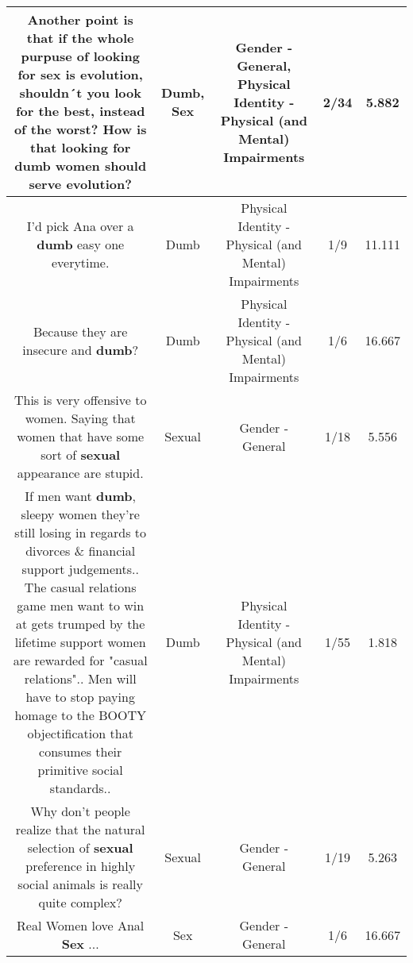 \documentclass[11pt]{article}
\newlength\mylength
\begin{document}
\begin{center}
\begin{longtable}{|C{.65\mylength}|C{.30\mylength}|C{.12\mylength}|C{.12\mylength}|C{.12\mylength}|}
  \small Another point is that if the whole purpuse of looking for \textbf{sex} is evolution, shouldn´t you look for the best, instead of the worst? How is that looking for \textbf{dumb} women should serve evolution?\normalsize   & Dumb, Sex & Gender - General, Physical Identity - Physical (and Mental) Impairments & 2/34 & 5.882 \\  \hline
  \small I'd pick Ana over a \textbf{dumb} easy one everytime.\normalsize   & Dumb & Physical Identity - Physical (and Mental) Impairments & 1/9 & 11.111 \\  \hline
  \small Because they are insecure and \textbf{dumb}?\normalsize   & Dumb & Physical Identity - Physical (and Mental) Impairments & 1/6 & 16.667 \\  \hline
  \small This is very offensive to women. Saying that women that have some sort of \textbf{sexual} appearance are stupid.\normalsize   & Sexual & Gender - General & 1/18 & 5.556 \\  \hline
  \small If men want \textbf{dumb}, sleepy women they're still losing in regards to divorces \& financial support judgements.. The casual relations game men want to win at gets trumped by the lifetime support women are rewarded for "casual relations".. Men will have to stop paying homage to the BOOTY objectification that consumes their primitive social standards..\normalsize   & Dumb & Physical Identity - Physical (and Mental) Impairments & 1/55 & 1.818 \\  \hline
  \small Why don't people realize that the natural selection of \textbf{sexual} preference in highly social animals is really quite complex?\normalsize   & Sexual & Gender - General & 1/19 & 5.263 \\  \hline
  \small Real Women love Anal \textbf{Sex} ...\normalsize   & Sex & Gender - General & 1/6 & 16.667 \\  \hline

\end{longtable}
\end{center}
\end{document}
